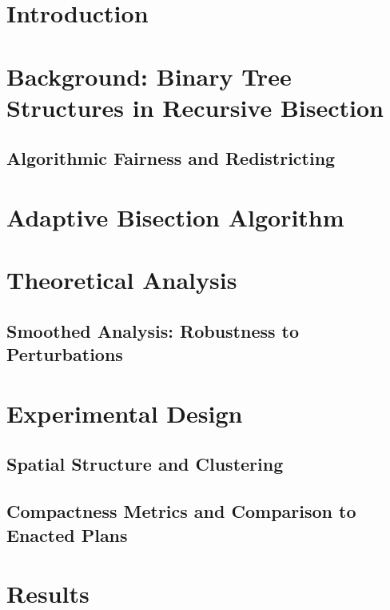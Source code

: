 \documentclass[12pt]{article}
\begin{document}
\section{Introduction}


\section{Background: Binary Tree Structures in Recursive Bisection}


\subsection{Algorithmic Fairness and Redistricting}


\section{Adaptive Bisection Algorithm}


\section{Theoretical Analysis}


\subsection{Smoothed Analysis: Robustness to Perturbations}


\section{Experimental Design}


\subsection{Spatial Structure and Clustering}


\subsection{Compactness Metrics and Comparison to Enacted Plans}


\section{Results}
\label{sec:results}

\end{document}
